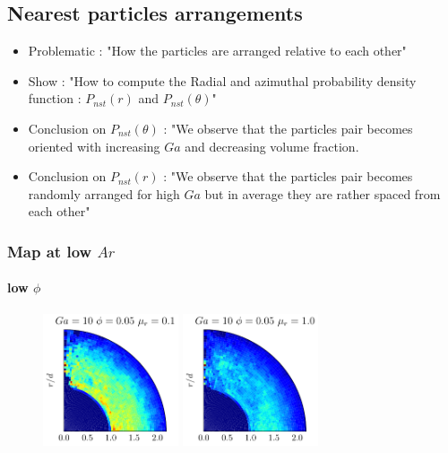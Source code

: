 






\subsection{Nearest particles arrangements}
\begin{itemize}
    \item Problematic : "How the particles are arranged relative to each other"
    \item Show : "How to compute the Radial and azimuthal probability density function : $P_{nst}(r)$  and $P_{nst}(\theta)$"
    \item  Conclusion on $P_{nst}(\theta)$ : "We observe that the particles pair becomes oriented with increasing $Ga$ and decreasing volume fraction.
    \item  Conclusion on $P_{nst}(r)$ : "We observe that the particles pair becomes randomly arranged for high $Ga$ but in average they are rather spaced from each other" 
\end{itemize}


\subsubsection{Map at low $Ar$}

\paragraph{low $\phi$}
\begin{figure}
\centering
\includegraphics[width=4cm]{image/HOMOGENEOUS/fDrop/Pnst_mu_r_0_1_Ga_10_PHI_0_05}
\includegraphics[width=4cm]{image/HOMOGENEOUS/fDrop/Pnst_mu_r_1_0_Ga_10_PHI_0_05}
\end{figure}


